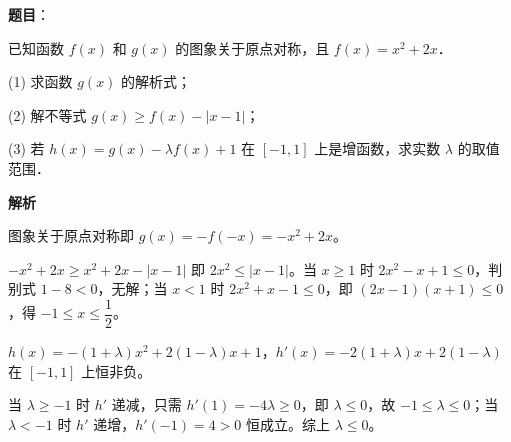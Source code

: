 \begin{answer}

\textbf{题目}：

已知函数 $f(x)$ 和 $g(x)$ 的图象关于原点对称，且 $f(x) = x^2 + 2x$．

(1) 求函数 $g(x)$ 的解析式；

(2) 解不等式 $g(x) \geqslant f(x) - |x - 1|$；

(3) 若 $h(x) = g(x) - \lambda f(x) + 1$ 在 $[-1, 1]$ 上是增函数，求实数 $\lambda$ 的取值范围．

\textbf{解析}


图象关于原点对称即 $g(x) = -f(-x) = -x^2 + 2x$。


$-x^2 + 2x \geqslant x^2 + 2x - |x - 1|$ 即 $2x^2 \leqslant |x - 1|$。当 $x \geqslant 1$ 时 $2x^2 - x + 1 \leqslant 0$，判别式 $1 - 8 < 0$，无解；当 $x < 1$ 时 $2x^2 + x - 1 \leqslant 0$，即 $(2x - 1)(x + 1) \leqslant 0$，得 $-1 \leqslant x \leqslant \dfrac{1}{2}$。


$h(x) = -(1 + \lambda)x^2 + 2(1 - \lambda)x + 1$，$h'(x) = -2(1 + \lambda)x + 2(1 - \lambda)$ 在 $[-1, 1]$ 上恒非负。

当 $\lambda \geqslant -1$ 时 $h'$ 递减，只需 $h'(1) = -4\lambda \geqslant 0$，即 $\lambda \leqslant 0$，故 $-1 \leqslant \lambda \leqslant 0$；当 $\lambda < -1$ 时 $h'$ 递增，$h'(-1) = 4 > 0$ 恒成立。综上 $\lambda \leqslant 0$。




\end{answer}